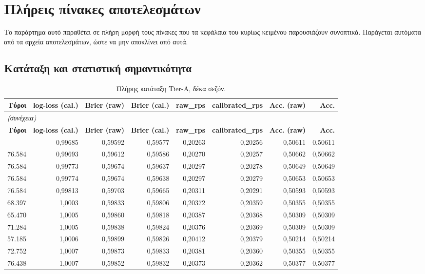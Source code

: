 
\chapter{Πλήρεις πίνακες αποτελεσμάτων}
\label{app:tables}

Το παράρτημα αυτό παραθέτει σε πλήρη μορφή τους πίνακες που τα κεφάλαια του κυρίως κειμένου
παρουσιάζουν συνοπτικά. Παράγεται αυτόματα από τα αρχεία αποτελεσμάτων, ώστε να μην
αποκλίνει από αυτά.

\section{Κατάταξη και στατιστική σημαντικότητα}
{\scriptsize
\begin{longtable}{@{}rrrrrrrr@{}}
\caption{Πλήρης κατάταξη Tier-A, δέκα σεζόν.}\label{app:ranking}\\
\toprule \textbf{Γύροι} & \textbf{log-loss (cal.)} & \textbf{Brier (raw)} & \textbf{Brier (cal.)} & \textbf{raw\_rps} & \textbf{calibrated\_rps} & \textbf{Acc. (raw)} & \textbf{Acc.} \\\midrule\endfirsthead
\multicolumn{8}{l}{\emph{(συνέχεια)}}\\\toprule \textbf{Γύροι} & \textbf{log-loss (cal.)} & \textbf{Brier (raw)} & \textbf{Brier (cal.)} & \textbf{raw\_rps} & \textbf{calibrated\_rps} & \textbf{Acc. (raw)} & \textbf{Acc.} \\\midrule\endhead
\bottomrule\endfoot
71.818 & 0,99685 & 0,59592 & 0,59577 & 0,20263 & 0,20256 & 0,50611 & 0,50611 \\
76.584 & 0,99693 & 0,59612 & 0,59586 & 0,20270 & 0,20257 & 0,50662 & 0,50662 \\
76.584 & 0,99773 & 0,59674 & 0,59637 & 0,20297 & 0,20278 & 0,50649 & 0,50649 \\
76.584 & 0,99774 & 0,59674 & 0,59638 & 0,20297 & 0,20279 & 0,50653 & 0,50653 \\
76.584 & 0,99813 & 0,59703 & 0,59665 & 0,20311 & 0,20291 & 0,50593 & 0,50593 \\
68.397 & 1,0003 & 0,59833 & 0,59806 & 0,20372 & 0,20359 & 0,50355 & 0,50355 \\
65.470 & 1,0005 & 0,59860 & 0,59818 & 0,20387 & 0,20368 & 0,50309 & 0,50309 \\
71.284 & 1,0005 & 0,59838 & 0,59824 & 0,20376 & 0,20369 & 0,50309 & 0,50309 \\
57.185 & 1,0006 & 0,59899 & 0,59826 & 0,20412 & 0,20379 & 0,50214 & 0,50214 \\
72.752 & 1,0007 & 0,59873 & 0,59833 & 0,20381 & 0,20360 & 0,50355 & 0,50355 \\
76.438 & 1,0007 & 0,59852 & 0,59832 & 0,20373 & 0,20362 & 0,50377 & 0,50377 \\
\end{longtable}
}

